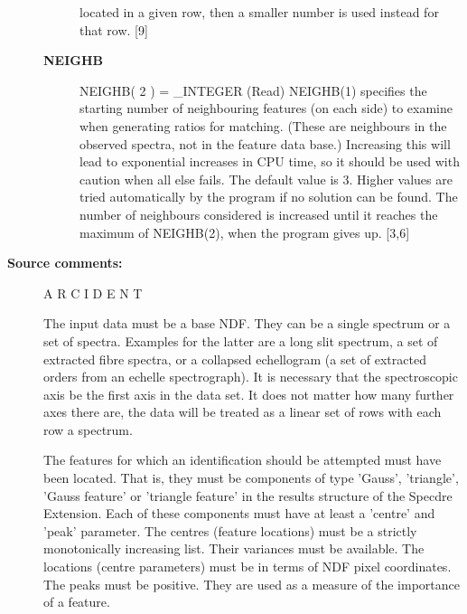 \begin{description}
\begin{description}
   located in a given row, then a smaller number is used instead
   for that row. [9]
\item [\textbf{NEIGHB}]
NEIGHB( 2 ) = \_INTEGER (Read)
   NEIGHB(1) specifies the starting number of neighbouring
   features (on each side) to examine when generating ratios for
   matching. (These are neighbours in the observed spectra, not in
   the feature data base.) Increasing this will lead to
   exponential increases in CPU time, so it should be used with
   caution when all else fails. The default value is 3. Higher
   values are tried automatically by the program if no solution
   can be found. The number of neighbours considered is increased
   until it reaches the maximum of NEIGHB(2), when the program
   gives up. [3,6]

\end{description}

\item [\textbf{Source comments:}]
\begin{terminalv}
   A R C I D E N T

   The input data must be a base NDF. They can be a single spectrum
   or a set of spectra. Examples for the latter are a long slit
   spectrum, a set of extracted fibre spectra, or a collapsed
   echellogram (a set of extracted orders from an echelle
   spectrograph). It is necessary that the spectroscopic axis be the
   first axis in the data set. It does not matter how many further
   axes there are, the data will be treated as a linear set of rows
   with each row a spectrum.

   The features for which an identification should be attempted must
   have been located. That is, they must be components of type
   'Gauss', 'triangle', 'Gauss feature' or 'triangle feature' in the
   results structure of the Specdre Extension. Each of these
   components must have at least a 'centre' and 'peak' parameter. The
   centres (feature locations) must be a strictly monotonically
   increasing list. Their variances must be available. The locations
   (centre parameters) must be in terms of NDF pixel coordinates. The
   peaks must be positive. They are used as a measure of the
   importance of a feature.


\end{terminalv}
\end{description}
